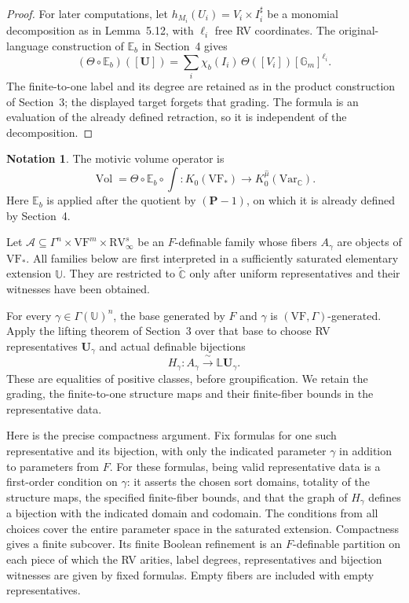 \documentclass[12pt]{amsart}
\theoremstyle{remark}
\theoremstyle{definition}
\newtheorem{nota}[lem]{Notation}
\newcommand{\C}{\mathds{C}}
\newcommand{\RV}{\mathrm{RV}}
\newcommand{\VF}{\mathrm{VF}}
\numberwithin{equation}{section}
\newcommand{\Gm}{\mathbb G_m}
\newcommand{\Var}{\mathrm{Var}}
\newcommand{\Kmon}{K_0^{\widehat\mu}(\Var_{\C})}
\newcommand{\E}{\mathbb E_b}
\newcommand{\Vol}{\operatorname{Vol}}
\newcommand{\LiftingTheorem}{the lifting theorem of Section~3}
\begin{document}
{\begin{proof}
For later computations, let
$h_{M_i}(U_i)=V_i\times I_i^\sharp$ be a monomial decomposition
as in Lemma~5.12, with $\ell_i$ free RV coordinates.
The original-language construction of $\E$ in Section~4 gives
\begin{equation}\label{twist:C}
 (\Theta\circ\E)([\bm U])
   =\sum_i\chi_b(I_i)\,\Theta([V_i])[\Gm]^{\ell_i}.
\end{equation}
The finite-to-one label and its degree are retained as in the
product construction of Section~3; the displayed target forgets
that grading. The formula is an evaluation of the already defined
retraction, so it is independent of the decomposition.
\end{proof}

\begin{nota}\label{mov:vol}
The motivic volume operator is
\[
 \Vol=\Theta\circ\E\circ\int:
 K_0(\VF_*)\longrightarrow\Kmon .
\]
Here $\E$ is applied after the quotient by $(\bm P-1)$,
on which it is already defined by Section~4.
\end{nota}

Let $\mathcal A\subseteq\Gamma^n\times\VF^m\times\RV_\infty^s$
be an $F$-definable family whose fibers $A_\gamma$ are objects
of $\VF_*$. All families below are first interpreted in a
sufficiently saturated elementary extension $\mathbb U$.
They are restricted to $\widetilde{\C}$ only after uniform
representatives and their witnesses have been obtained.

For every $\gamma\in\Gamma(\mathbb U)^n$,
the base generated by $F$ and $\gamma$ is
$(\VF,\Gamma)$-generated. Apply \LiftingTheorem{} over that
base to choose RV representatives $\bm U_\gamma$ and actual
definable bijections
\[
 H_\gamma:A_\gamma\xrightarrow{\ \sim\ }\mathbb L\bm U_\gamma.
\]
These are equalities of positive classes, before groupification.
We retain the grading, the finite-to-one structure maps and
their finite-fiber bounds in the representative data.

Here is the precise compactness argument. Fix formulas for one
such representative and its bijection, with only the indicated
parameter $\gamma$ in addition to parameters from $F$.
For these formulas, being valid representative data is a
first-order condition on $\gamma$: it asserts the chosen sort
domains, totality of the structure maps, the specified finite-fiber
bounds, and that the graph of $H_\gamma$ defines a bijection with
the indicated domain and codomain.
The conditions from all choices cover the entire parameter
space in the saturated extension. Compactness gives a finite
subcover. Its finite Boolean refinement is an $F$-definable
partition on each piece of which the RV arities, label degrees,
representatives and bijection witnesses are given by fixed
formulas. Empty fibers are included with empty representatives.

}
\end{document}

